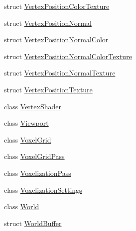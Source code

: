 \begin{DoxyCompactItemize}
\item 
struct \mbox{\hyperlink{structmage_1_1rendering_1_1_vertex_position_color_texture}{Vertex\+Position\+Color\+Texture}}
\item 
struct \mbox{\hyperlink{structmage_1_1rendering_1_1_vertex_position_normal}{Vertex\+Position\+Normal}}
\item 
struct \mbox{\hyperlink{structmage_1_1rendering_1_1_vertex_position_normal_color}{Vertex\+Position\+Normal\+Color}}
\item 
struct \mbox{\hyperlink{structmage_1_1rendering_1_1_vertex_position_normal_color_texture}{Vertex\+Position\+Normal\+Color\+Texture}}
\item 
struct \mbox{\hyperlink{structmage_1_1rendering_1_1_vertex_position_normal_texture}{Vertex\+Position\+Normal\+Texture}}
\item 
struct \mbox{\hyperlink{structmage_1_1rendering_1_1_vertex_position_texture}{Vertex\+Position\+Texture}}
\item 
class \mbox{\hyperlink{classmage_1_1rendering_1_1_vertex_shader}{Vertex\+Shader}}
\item 
class \mbox{\hyperlink{classmage_1_1rendering_1_1_viewport}{Viewport}}
\item 
class \mbox{\hyperlink{classmage_1_1rendering_1_1_voxel_grid}{Voxel\+Grid}}
\item 
class \mbox{\hyperlink{classmage_1_1rendering_1_1_voxel_grid_pass}{Voxel\+Grid\+Pass}}
\item 
class \mbox{\hyperlink{classmage_1_1rendering_1_1_voxelization_pass}{Voxelization\+Pass}}
\item 
class \mbox{\hyperlink{classmage_1_1rendering_1_1_voxelization_settings}{Voxelization\+Settings}}
\item 
class \mbox{\hyperlink{classmage_1_1rendering_1_1_world}{World}}
\item 
struct \mbox{\hyperlink{structmage_1_1rendering_1_1_world_buffer}{World\+Buffer}}
\end{DoxyCompactItemize}
